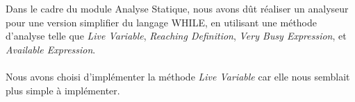 Dans le cadre du module Analyse Statique, nous avons dût réaliser un analyseur pour une version simplifier du langage WHILE, en utilisant une méthode d'analyse telle que \emph{Live Variable}, \emph{Reaching Definition}, \emph{Very Busy Expression}, et \emph{Available Expression}.
\paragraph{}
Nous avons choisi d'implémenter la méthode \emph{Live Variable} car elle nous semblait plus simple à implémenter.